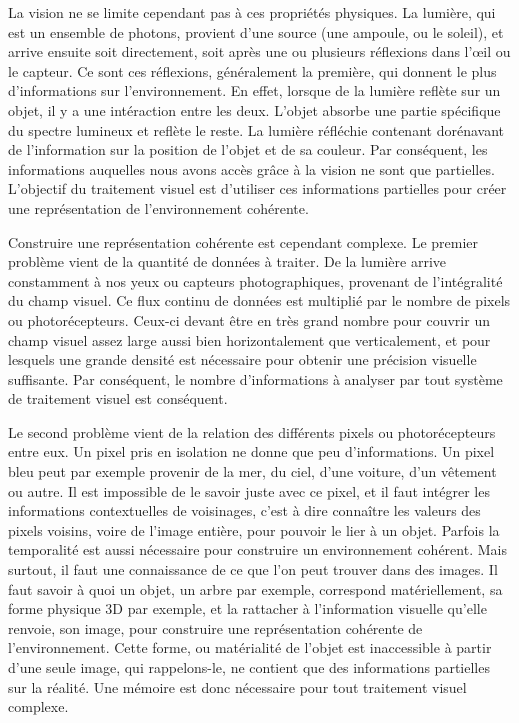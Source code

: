 	La vision ne se limite cependant pas à ces propriétés physiques. La lumière, qui est un ensemble de photons, provient d'une source (une ampoule, ou le soleil), et arrive ensuite soit directement, soit après une ou plusieurs réflexions dans l'œil ou le capteur. Ce sont ces réflexions, généralement la première, qui donnent le plus d'informations sur l'environnement. En effet, lorsque de la lumière reflète sur un objet, il y a une intéraction entre les deux. L'objet absorbe une partie spécifique du spectre lumineux et reflète le reste. La lumière réfléchie contenant dorénavant de l'information sur la position de l'objet et de sa couleur. Par conséquent, les informations auquelles nous avons accès grâce à la vision ne sont que partielles. L'objectif du traitement visuel est d'utiliser ces informations partielles pour créer une représentation de l'environnement cohérente.

	Construire une représentation cohérente est cependant complexe. Le premier problème vient de la quantité de données à traiter. De la lumière arrive constamment à nos yeux ou capteurs photographiques, provenant de l'intégralité du champ visuel. Ce flux continu de données est multiplié par le nombre de pixels ou photorécepteurs. Ceux-ci devant être en très grand nombre pour couvrir un champ visuel assez large aussi bien horizontalement que verticalement, et pour lesquels une grande densité est nécessaire pour obtenir une précision visuelle suffisante. Par conséquent, le nombre d'informations à analyser par tout système de traitement visuel est conséquent.

	Le second problème vient de la relation des différents pixels ou photorécepteurs entre eux. Un pixel pris en isolation ne donne que peu d'informations. Un pixel bleu peut par exemple provenir de la mer, du ciel, d'une voiture, d'un vêtement ou autre. Il est impossible de le savoir juste avec ce pixel, et il faut intégrer les informations contextuelles de voisinages, c'est à dire connaître les valeurs des pixels voisins, voire de l'image entière, pour pouvoir le lier à un objet. Parfois la temporalité est aussi nécessaire pour construire un environnement cohérent. Mais surtout, il faut une connaissance de ce que l'on peut trouver dans des images. Il faut savoir à quoi un objet, un arbre par exemple, correspond matériellement, sa forme physique 3D par exemple, et la rattacher à l'information visuelle qu'elle renvoie, son image, pour construire une représentation cohérente de l'environnement. Cette forme, ou matérialité de l'objet est inaccessible à partir d'une seule image, qui rappelons-le, ne contient que des informations partielles sur la réalité. Une mémoire est donc nécessaire pour tout traitement visuel complexe.

